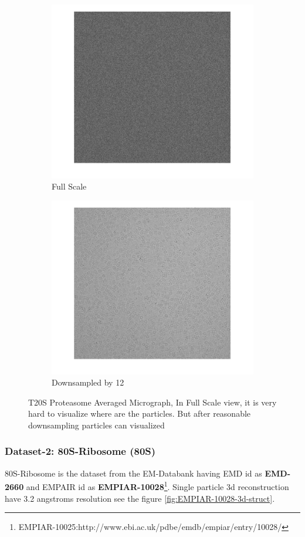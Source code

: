 \documentclass{report}
\begin{document}
\begin{figure}[H]
\centering
\begin{subfigure}{.5\textwidth}
\centering
\includegraphics[width=0.5\linewidth]{EM-10025-micrograph-full_micrograph}
\captionsetup{justification=centering}
\caption{ Full Scale }
\end{subfigure} 
\begin{subfigure}{.48\textwidth}
\centering
\includegraphics[width=0.5\linewidth]{EM-10025-micrograph-full-down-12_micrograph}
\captionsetup{justification=centering}
\caption{Downsampled by 12}
\end{subfigure}
\caption{T20S Proteasome Averaged Micrograph, In Full Scale view, it is very hard to visualize where are the particles. But after reasonable downsampling particles can  visualized }
\label{fig:EM-10025-Avg-micrograph}
\end{figure}

\subsubsection{Dataset-2: 80S-Ribosome (80S)}\label{subsec:80S-Ribosome}
80S-Ribosome is the dataset from the EM-Databank having EMD id as \textbf{EMD-2660} and EMPAIR id as \textbf{EMPIAR-10028}\footnote{\label{fn:EMPIAR-10025-1} EMPIAR-10025:http://www.ebi.ac.uk/pdbe/emdb/empiar/entry/10028/}. Single particle 3d reconstruction have 3.2 angstroms resolution see the figure \ref{fig:EMPIAR-10028-3d-struct}.
\end{document}
